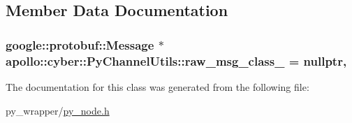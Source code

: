 \subsection{Member Data Documentation}
\hypertarget{classapollo_1_1cyber_1_1PyChannelUtils_a550b93539f7a24e67b3294439a69144c}{
\subsubsection[{raw\-\_\-msg\-\_\-class\-\_\-}]{\setlength{\rightskip}{0pt plus 5cm}google\-::protobuf\-::\-Message $\ast$ apollo\-::cyber\-::\-Py\-Channel\-Utils\-::raw\-\_\-msg\-\_\-class\-\_\- = nullptr\hspace{0.3cm}{\ttfamily [static]}, {\ttfamily [private]}}}\label{classapollo_1_1cyber_1_1PyChannelUtils_a550b93539f7a24e67b3294439a69144c}


The documentation for this class was generated from the following file\-:\begin{DoxyCompactItemize}
\item 
py\-\_\-wrapper/\hyperlink{py__node_8h}{py\-\_\-node.\-h}\end{DoxyCompactItemize}
